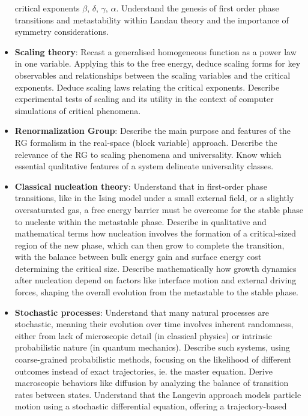 \documentclass[
  letterpaper,
  enabledeprecatedfontcommands]{report}
\begin{document}
\begin{itemize}
  critical exponents \(\beta\), \(\delta\), \(\gamma\), \(\alpha\).
  Understand the genesis of first order phase transitions and
  metastability within Landau theory and the importance of symmetry
  considerations.
\item
  \textbf{Scaling theory}: Recast a generalised homogeneous function as
  a power law in one variable. Applying this to the free energy, deduce
  scaling forms for key observables and relationships between the
  scaling variables and the critical exponents. Deduce scaling laws
  relating the critical exponents. Describe experimental tests of
  scaling and its utility in the context of computer simulations of
  critical phenomena.
\item
  \textbf{Renormalization Group}: Describe the main purpose and features
  of the RG formalism in the real-space (block variable) approach.
  Describe the relevance of the RG to scaling phenomena and
  universality. Know which essential qualitative features of a system
  delineate universality classes.
\item
  \textbf{Classical nucleation theory}: Understand that in first-order
  phase transitions, like in the Ising model under a small external
  field, or a slightly oversaturated gas, a free energy barrier must be
  overcome for the stable phase to nucleate within the metastable phase.
  Describe in qualitative and mathematical terms how nucleation involves
  the formation of a critical-sized region of the new phase, which can
  then grow to complete the transition, with the balance between bulk
  energy gain and surface energy cost determining the critical size.
  Describe mathematically how growth dynamics after nucleation depend on
  factors like interface motion and external driving forces, shaping the
  overall evolution from the metastable to the stable phase.
\item
  \textbf{Stochastic processes}: Understand that many natural processes
  are stochastic, meaning their evolution over time involves inherent
  randomness, either from lack of microscopic detail (in classical
  physics) or intrinsic probabilistic nature (in quantum mechanics).
  Describe such systems, using coarse-grained probabilistic methods,
  focusing on the likelihood of different outcomes instead of exact
  trajectories, ie. the master equation. Derive macroscopic behaviors
  like diffusion by analyzing the balance of transition rates between
  states. Understand that the Langevin approach models particle motion
  using a stochastic differential equation, offering a trajectory-based

\end{itemize}
\end{document}
